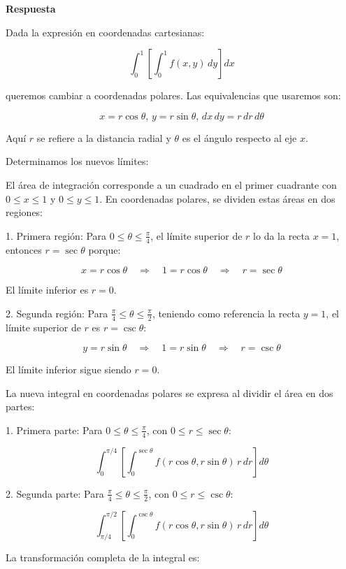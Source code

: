 \documentclass{report}
\begin{document}
\textbf{Respuesta}

Dada la expresión en coordenadas cartesianas:

\[
\int_{0}^{1}\left[\int_{0}^{1} f(x, y) \, dy\right] dx
\]

queremos cambiar a coordenadas polares. Las equivalencias que usaremos son:

\[
x = r \cos \theta, \, y = r \sin \theta, \, dx \, dy = r \, dr \, d\theta
\]

Aquí \(r\) se refiere a la distancia radial y \(\theta\) es el ángulo respecto al eje \(x\).

Determinamos los nuevos límites:

El área de integración corresponde a un cuadrado en el primer cuadrante con \(0 \leq x \leq 1\) y \(0 \leq y \leq 1\). En coordenadas polares, se dividen estas áreas en dos regiones:

1. Primera región:
   Para \(0 \leq \theta \leq \frac{\pi}{4}\), el límite superior de \(r\) lo da la recta \(x = 1\), entonces \(r = \sec \theta\) porque:

   \[
   x = r \cos \theta \quad \Rightarrow \quad 1 = r \cos \theta \quad \Rightarrow \quad r = \sec \theta
   \]

   El límite inferior es \(r = 0\).

2. Segunda región:
   Para \(\frac{\pi}{4} \leq \theta \leq \frac{\pi}{2}\), teniendo como referencia la recta \(y = 1\), el límite superior de \(r\) es \(r = \csc \theta\):

   \[
   y = r \sin \theta \quad \Rightarrow \quad 1 = r \sin \theta \quad \Rightarrow \quad r = \csc \theta
   \]

   El límite inferior sigue siendo \(r = 0\).

La nueva integral en coordenadas polares se expresa al dividir el área en dos partes:

1. Primera parte:
   Para \(0 \leq \theta \leq \frac{\pi}{4}\), con \(0 \leq r \leq \sec \theta\):

   \[
   \int_{0}^{\pi/4} \left[\int_{0}^{\sec{\theta}} f\left(r \cos \theta, r \sin \theta\right) \, r \, dr \right] d\theta
   \]

2. Segunda parte:
   Para \(\frac{\pi}{4} \leq \theta \leq \frac{\pi}{2}\), con \(0 \leq r \leq \csc \theta\):

   \[
   \int_{\pi/4}^{\pi/2} \left[\int_{0}^{\csc{\theta}} f\left(r \cos \theta, r \sin \theta\right) \, r \, dr \right] d\theta
   \]

La transformación completa de la integral es:
\end{document}
